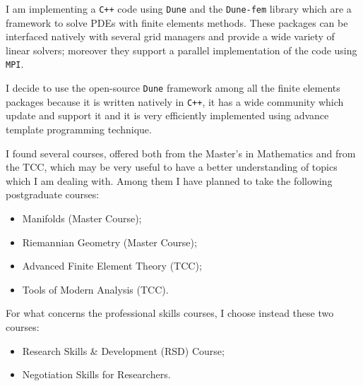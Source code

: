 \documentclass[a4paper,12pt]{report}
\begin{document}
I am implementing a \verb|C++| code using \verb|Dune| and the \verb|Dune-fem| library which are a framework to solve PDEs with finite elements methods. These packages can be interfaced natively with several grid managers and provide a wide variety of linear solvers; moreover they support a parallel implementation of the code using \verb|MPI|.

I decide to use the open-source \verb|Dune| framework among all the finite elements packages because it is written natively in \verb|C++|, it has a wide community which update and support it and it is very efficiently implemented using advance template programming technique.
\newline

I found several courses, offered both from the Master's in Mathematics and from the TCC, which may be very useful to have a better understanding of topics which I am dealing with. Among them I have planned to take the following postgraduate courses:
\begin{itemize}
\item Manifolds (Master Course);
\item Riemannian Geometry (Master Course);
\item Advanced Finite Element Theory (TCC);
\item Tools of Modern Analysis (TCC).
\end{itemize}

For what concerns the professional skills courses, I choose instead these two courses:
\begin{itemize}
\item Research Skills \& Development (RSD) Course;
\item Negotiation Skills for Researchers.
\end{itemize}
\end{document}
